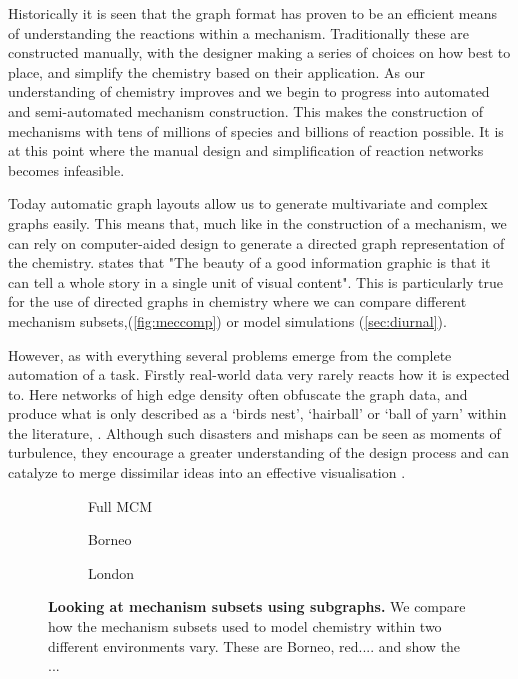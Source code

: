 Historically it is seen that the graph format has proven to be an efficient means of understanding the reactions within a mechanism. Traditionally these are constructed manually, with the designer making a series of choices on how best to place, and simplify the chemistry based on their application. As our understanding of chemistry improves and we begin to progress into automated and semi-automated mechanism construction. This makes the construction of mechanisms with tens of millions of species and billions of reaction possible. It is at this point where the manual design and simplification of reaction networks becomes infeasible. 

Today automatic graph layouts allow us to generate multivariate and complex graphs easily. This means that, much like in the construction of a mechanism, we can rely on computer-aided design to generate a directed graph representation of the chemistry. \cite{sciamerican} states that "The beauty of a good information graphic is that it can tell a whole story in a single unit of visual content". This is particularly true for the use of directed graphs in chemistry where we can compare different mechanism subsets,(\autoref{fig:meccomp}) or model simulations (\autoref{sec:diurnal}).

However, as with everything several problems emerge from the complete automation of a task. Firstly real-world data very rarely reacts how it is expected to. Here networks of high edge density often obfuscate the graph data, and produce what is only described as a `birds nest', `hairball' or `ball of yarn' within the literature, \cite{ch7}. Although such disasters and mishaps can be seen as moments of turbulence, they encourage a greater understanding of the design process and can catalyze to merge dissimilar ideas into an effective visualisation \cite{goodideas}. 



\begin{figure}[H]
     \centering
     \begin{subfigure}[b]{0.29\textwidth}
         \centering
         \caption{Full MCM}
     \end{subfigure}
     \begin{subfigure}[b]{0.29\textwidth}
         \centering
         \caption{Borneo}
     \end{subfigure}
     \begin{subfigure}[b]{0.29\textwidth}
         \centering
         \caption{London}
     \end{subfigure}
        \caption{\textbf{Looking at mechanism subsets using subgraphs. } We compare how the mechanism subsets used to model chemistry within two different environments vary. These are Borneo, red.... and show the ...   }
        \label{fig:mechcomp}
\end{figure}





